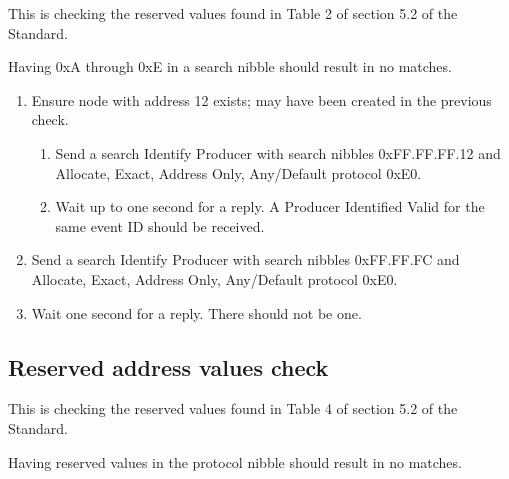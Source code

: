 This is checking the reserved values found in Table 2 of section 5.2 of the Standard.

Having 0xA through 0xE in a search nibble should result in no matches.

\begin{enumerate}

\item Ensure node with address 12 exists; may have been created in the previous check.

    \begin{enumerate}
    \item Send a search Identify Producer with search nibbles 0xFF.FF.FF.12 and 
        Allocate, Exact, Address Only, Any/Default protocol 0xE0.

    \item Wait up to one second for a reply.  A Producer Identified Valid for the same event ID
        should be received.
    \end{enumerate}

\item Send a search Identify Producer with search nibbles 0xFF.FF.FC and 
    Allocate, Exact, Address Only, Any/Default protocol 0xE0.

\item Wait one second for a reply.  There should not be one.

\end{enumerate}

\subsection{Reserved address values check}

This is checking the reserved values found in Table 4 of section 5.2 of the Standard.

Having reserved values in the protocol nibble should result in no matches.

